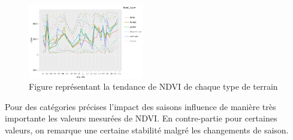 \documentclass[twocolumn,10pt]{article}
\begin{document}
\begin{figure}[htbp]
	\begin{center}
		\includegraphics[width=0.45\textwidth]{figures/Analyse_exploratoire/tendance_forest_grass_farm_orchard.png}
		\caption{\label{fig:tendance_forest_grass_farm_orchard}Figure représentant la tendance de NDVI de chaque type de terrain}
	\end{center}
\end{figure}

Pour des catégories précises l'impact des saisons influence de manière très importante les valeurs mesurées de NDVI. En contre-partie pour certaines valeurs, on remarque une certaine stabilité malgré les changements de saison. 
\end{document}
